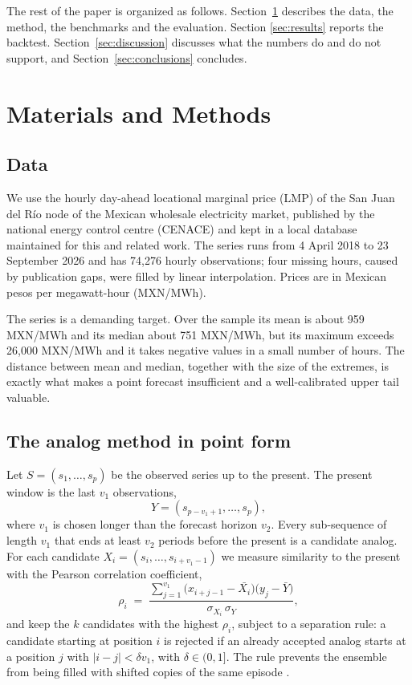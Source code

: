 \documentclass[12pt,a4paper]{article}
\begin{document}
The rest of the paper is organized as follows. Section~\ref{sec:methods}
describes the data, the method, the benchmarks and the evaluation. Section
\ref{sec:results} reports the backtest. Section~\ref{sec:discussion} discusses
what the numbers do and do not support, and Section~\ref{sec:conclusions}
concludes.

\section{Materials and Methods}
\label{sec:methods}

\subsection{Data}
\label{sec:data}

We use the hourly day-ahead locational marginal price (LMP) of the San Juan
del R\'io node of the Mexican wholesale electricity market, published by the
national energy control centre (CENACE) and kept in a local database
maintained for this and related work. The series runs from 4 April 2018 to 23 September 2026 and has
74,276 hourly observations; four missing hours, caused by publication
gaps, were filled by linear interpolation. Prices are in Mexican pesos per
megawatt-hour (MXN/MWh).

The series is a demanding target. Over the sample its mean is about
959 MXN/MWh and its median about 751 MXN/MWh, but its maximum
exceeds 26,000 MXN/MWh and it takes negative values in a small number of
hours. The distance between mean and median, together with the size of the
extremes, is exactly what makes a point forecast insufficient and a
well-calibrated upper tail valuable.

\subsection{The analog method in point form}
\label{sec:analog}

Let $S=(s_1,\dots,s_p)$ be the observed series up to the present. The present
window is the last $v_1$ observations,
\begin{equation}
Y=(s_{p-v_1+1},\dots,s_p),
\end{equation}
where $v_1$ is chosen longer than the forecast horizon $v_2$. Every
sub-sequence of length $v_1$ that ends at least $v_2$ periods before the
present is a candidate analog. For each candidate $X_i=(s_i,\dots,s_{i+v_1-1})$
we measure similarity to the present with the Pearson correlation
coefficient,
\begin{equation}
\rho_i \;=\; \frac{\sum_{j=1}^{v_1}\big(x_{i+j-1}-\bar{X_i}\big)
\big(y_j-\bar{Y}\big)}{\sigma_{X_i}\,\sigma_{Y}},
\end{equation}
and keep the $k$ candidates with the highest $\rho_i$, subject to a separation
rule: a candidate starting at position $i$ is rejected if an already accepted
analog starts at a position $j$ with $|i-j| < \delta v_1$, with
$\delta\in(0,1]$. The rule prevents the ensemble from being filled with
shifted copies of the same episode \citep{LezamaLope2023}.
\end{document}
